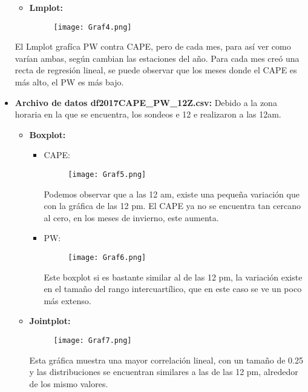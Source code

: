 \documentclass[a4paper]{article}
\begin{document}
\begin{itemize}
\begin{itemize}
\item\textbf{ Lmplot:}\\
\begin{figure}[h!]
  \texttt{[image: Graf4.png]}
  \centering
  \label{fig:G4}
\end{figure}
\end{itemize}

El Lmplot grafíca PW contra CAPE, pero de cada mes, para así ver como varían ambas, según cambian las estaciones del año. Para cada mes creó una recta de regresión lineal, se puede observar que los meses donde el CAPE es más alto, el PW es más bajo.

\item \textbf{Archivo de datos df2017CAPE\_PW\_12Z.csv: }
Debido a la zona horaria en la que se encuentra, los sondeos e 12 e realizaron a las 12am.
\begin{itemize}
\item \textbf{Boxplot:}
\begin{itemize}
\item CAPE: 
\begin{figure}[h!]
  \texttt{[image: Graf5.png]}
  \centering
  \label{fig:G5}
\end{figure}

Podemos observar que a las 12 am, existe una pequeña variación que con la gráfica de las 12 pm. El CAPE ya no se encuentra tan cercano al cero, en los meses de invierno, este aumenta. \\

\item PW: \\
\begin{figure}[h!]
  \texttt{[image: Graf6.png]}
  \centering
  \label{fig:G6}
\end{figure}

Este boxplot si es bastante similar al de las 12 pm, la variación existe en el tamaño del rango intercuartílico, que en este caso se ve un poco más extenso. 
\end{itemize}

\clearpage

\item \textbf{Jointplot:}\\
\begin{figure}[h!]
  \texttt{[image: Graf7.png]}
  \centering
  \label{fig:G7}  
\end{figure}

Esta gráfica muestra una mayor correlación lineal, con un tamaño de 0.25 y las distribuciones se encuentran similares a las de las 12 pm, alrededor de los mismo valores. \\


\end{itemize}
\end{itemize}
\end{document}
